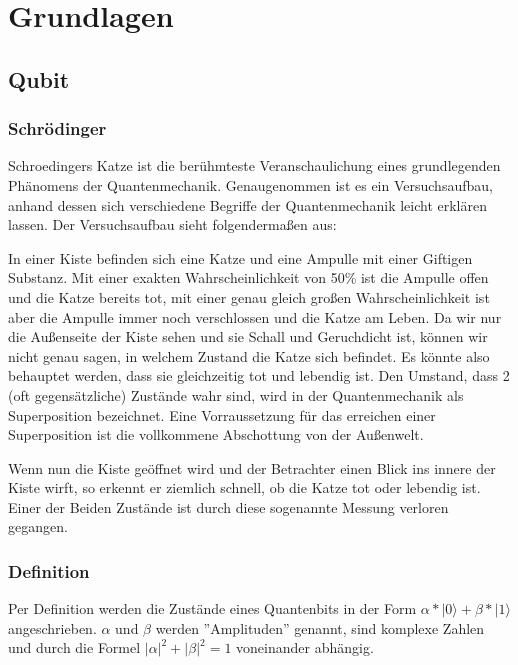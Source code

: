 
\section{Grundlagen}
\label{sec:grundlagen}

\subsection{Qubit}
\label{sec:qubit}

\subsubsection{Schrödinger}
\label{sec:schrodinger}

Schroedingers Katze ist die berühmteste Veranschaulichung eines grundlegenden Phänomens der Quantenmechanik. Genaugenommen ist es ein Versuchsaufbau, anhand dessen sich verschiedene Begriffe der Quantenmechanik leicht erklären lassen. Der Versuchsaufbau sieht folgendermaßen aus:

In einer Kiste befinden sich eine Katze und eine Ampulle mit einer Giftigen Substanz. Mit einer exakten Wahrscheinlichkeit von 50\% ist die Ampulle offen und die Katze bereits tot, mit einer genau gleich großen Wahrscheinlichkeit ist aber die Ampulle immer noch verschlossen und die Katze am Leben. Da wir nur die Außenseite der Kiste sehen und sie Schall und Geruchdicht ist, können wir nicht genau sagen, in welchem Zustand die Katze sich befindet. Es könnte also behauptet werden, dass sie gleichzeitig tot und lebendig ist.
Den Umstand, dass 2 (oft gegensätzliche) Zustände wahr sind, wird in der Quantenmechanik als Superposition bezeichnet. Eine Vorraussetzung für das erreichen einer Superposition ist die vollkommene Abschottung von der Außenwelt. 

Wenn nun die Kiste geöffnet wird und der Betrachter einen Blick ins innere der Kiste wirft, so erkennt er ziemlich schnell, ob die Katze tot oder lebendig ist. Einer der Beiden Zustände ist durch diese sogenannte Messung verloren gegangen.

\subsubsection{Definition}
\label{sec:bit_definition}

Per Definition werden die Zustände eines Quantenbits in der Form $\alpha * |0\rangle + \beta * |1\rangle$ angeschrieben.
$\alpha$ und $\beta$ werden ''Amplituden'' genannt, sind komplexe Zahlen und durch die Formel $|\alpha|^2 + |\beta|^2 = 1$ voneinander abhängig.


